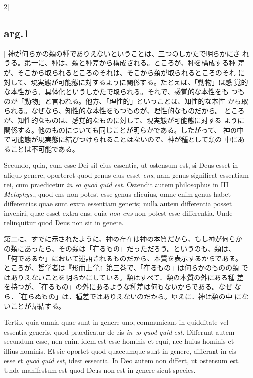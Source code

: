 \documentclass[paper=a4paper,fontsize=10pt,jafontsize=9pt,titlepage]{jlreq}
\begin{document}
\begin{paracol}{2}[\subsection{arg.1}]
神が何らかの類の種でありえないということは、三つのしかたで明らかにさ
れうる。第一に、種は、類と種差から構成される。ところが、種を構成する種
差が、そこから取られるところのそれは、そこから類が取られるところのそれ
に対して、現実態が可能態に対するように関係する。たとえば、「動物」は感
覚的な本性から、具体化というしかたで取られる。それで、感覚的な本性をも
つものが「動物」と言われる。他方、「理性的」ということは、知性的な本性
から取られる。なぜなら、知性的な本性をもつものが、理性的なものだから。
ところが、知性的なものは、感覚的なものに対して、現実態が可能態に対する
ように関係する。他のものについても同じことが明らかである。したがって、
神の中で可能態が現実態に結びつけられることはないので、神が種として類の
中にあることは不可能である。

\switchcolumn*

Secundo, quia, cum esse Dei sit eius essentia, ut ostensum est, si
Deus esset in aliquo genere, oporteret quod genus eius esset {\itshape
ens}, nam genus significat essentiam rei, cum praedicetur {\itshape in
eo quod quid est}.  Ostendit autem philosophus in III {\itshape
Metaphys}., quod ens non potest esse genus alicuius, omne enim genus
habet differentias quae sunt extra essentiam generis; nulla autem
differentia posset inveniri, quae esset extra ens; quia {\itshape non
ens} non potest esse differentia.  Unde relinquitur quod Deus non sit
in genere.

\switchcolumn

第二に、すでに示されたように、神の存在は神の本質だから、もし神が何らか
の類にあったら、その類は「在るもの」だっただろう。というのも、類は、
「何であるか」において述語されるものだから、本質を表示するからである。
ところが、哲学者は『形而上学』第三巻で、「在るもの」は何らかのものの類
ではありえないことを明らかにしている。類はすべて、類の本質の外にある種
差を持つが、「在るもの」の外にあるような種差は何もないからである。なぜ
なら、「在らぬもの」は、種差ではありえないのだから。ゆえに、神は類の中
にないことが帰結する。

\switchcolumn*

Tertio, quia omnia quae sunt in genere uno, communicant in quidditate
vel essentia generis, quod praedicatur de eis {\itshape in eo quod
quid est}.  Differunt autem secundum esse, non enim idem est esse
hominis et equi, nec huius hominis et illius hominis.  Et sic oportet
quod quaecumque sunt in genere, differant in eis esse et {\itshape
quod quid est}, idest essentia.  In Deo autem non differt, ut ostensum
est.  Unde manifestum est quod Deus non est in genere sicut species.


\end{paracol}
\end{document}
